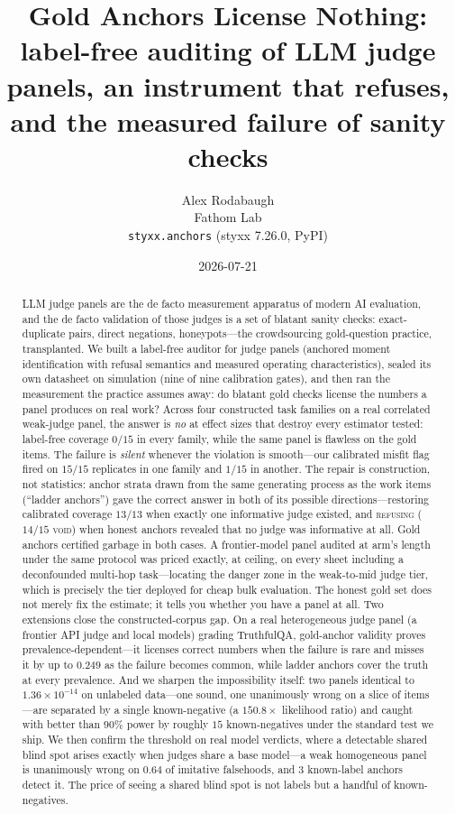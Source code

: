 \documentclass[11pt]{article}
\title{\textbf{Gold Anchors License Nothing:}\\[2pt]
\large label-free auditing of LLM judge panels, an instrument that refuses,\\
and the measured failure of sanity checks}
\author{Alex Rodabaugh\\ \small Fathom Lab \\ \small \texttt{styxx.anchors} (styxx 7.26.0, PyPI)}
\date{2026-07-21}
\begin{document}
\maketitle

\begin{abstract}
\noindent
LLM judge panels are the de facto measurement apparatus of modern AI evaluation, and the de facto
validation of those judges is a set of blatant sanity checks: exact-duplicate pairs, direct
negations, honeypots---the crowdsourcing gold-question practice, transplanted. We built a label-free
auditor for judge panels (anchored moment identification with refusal semantics and measured
operating characteristics), sealed its own datasheet on simulation (nine of nine calibration gates),
and then ran the measurement the practice assumes away: do blatant gold checks license the numbers a
panel produces on real work? Across four constructed task families on a real correlated weak-judge
panel, the answer is \emph{no} at effect sizes that destroy every estimator tested: label-free
coverage $0/15$ in every family, while the same panel is flawless on the gold items. The failure is
\emph{silent} whenever the violation is smooth---our calibrated misfit flag fired on $15/15$
replicates in one family and $1/15$ in another. The repair is construction, not statistics: anchor
strata drawn from the same generating process as the work items (``ladder anchors'') gave the correct
answer in both of its possible directions---restoring calibrated coverage $13/13$ when exactly one
informative judge existed, and \textsc{refusing} ($14/15$ \textsc{void}) when honest anchors revealed
that no judge was informative at all. Gold anchors certified garbage in both cases. A frontier-model
panel audited at arm's length under the same protocol was priced exactly, at ceiling, on every sheet
including a deconfounded multi-hop task---locating the danger zone in the weak-to-mid judge tier,
which is precisely the tier deployed for cheap bulk evaluation. The honest gold set does not merely
fix the estimate; it tells you whether you have a panel at all. Two extensions close the
constructed-corpus gap. On a real heterogeneous judge panel (a frontier API judge and local models)
grading TruthfulQA, gold-anchor validity proves prevalence-dependent---it licenses correct numbers when
the failure is rare and misses it by up to $0.249$ as the failure becomes common, while ladder anchors
cover the truth at every prevalence. And we sharpen the impossibility itself: two panels identical to
$1.36\times10^{-14}$ on unlabeled data---one sound, one unanimously wrong on a slice of items---are
separated by a single known-negative (a $150.8\times$ likelihood ratio) and caught with better than
$90\%$ power by roughly $15$ known-negatives under the standard test we ship. We then confirm the
threshold on real model verdicts, where a detectable shared blind spot arises exactly when judges share
a base model---a weak homogeneous panel is unanimously wrong on $0.64$ of imitative falsehoods, and $3$
known-label anchors detect it. The price of seeing a shared blind spot is not labels but a handful of
known-negatives.
\end{abstract}
\end{document}
